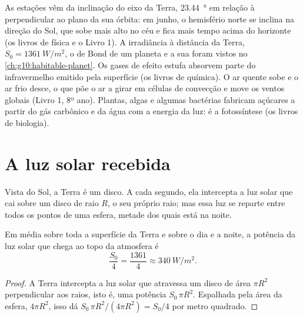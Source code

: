 \begin{recall}
As estações vêm da inclinação do eixo da Terra, \qty{23.44}{\degree} em
relação à perpendicular ao plano da sua órbita: em junho, o hemisfério
norte se inclina na direção do Sol, que sobe mais alto no céu e fica mais
tempo acima do horizonte (os livros de física e o Livro 1). A irradiância à
distância da Terra, $S_0 = \qty{1361}{W/m^2}$, o  de Bond de um
planeta e a sua  foram vistos no
\cref{ch:g10:habitable-planet}. Os gases de efeito estufa absorvem parte do
infravermelho emitido pela superfície (os livros de química). O ar quente
sobe e o ar frio desce, o que põe o ar a girar em células de convecção e
move os ventos globais (Livro 1, 8º ano). Plantas, algas e algumas
bactérias fabricam açúcares a partir do gás carbônico e da água com a
energia da luz: é a fotossíntese (os livros de biologia).
\end{recall}

\section{A luz solar recebida}

Vista do Sol, a Terra é um disco. A cada segundo, ela intercepta a luz
solar que cai sobre um disco de raio $R$, o seu próprio raio; mas essa luz
se reparte entre todos os pontos de uma esfera, metade dos quais está na
noite.

\begin{proposition}\label{prop:g10:earth-energy-budget:quarter}
Em média sobre toda a superfície da Terra e sobre o dia e a noite, a
potência da luz solar que chega ao topo da atmosfera é
\[
  \frac{S_0}{4} = \frac{1361}{4} \approx \qty{340}{W/m^2}.
\]
\end{proposition}

\begin{proof}
A Terra intercepta a luz solar que atravessa um disco de área $\pi R^2$
perpendicular aos raios, isto é, uma potência $S_0\,\pi R^2$. Espalhada pela
área da esfera, $4\pi R^2$, isso dá $S_0\,\pi R^2/(4\pi R^2) =
S_0/4$ por metro quadrado.
\end{proof}

